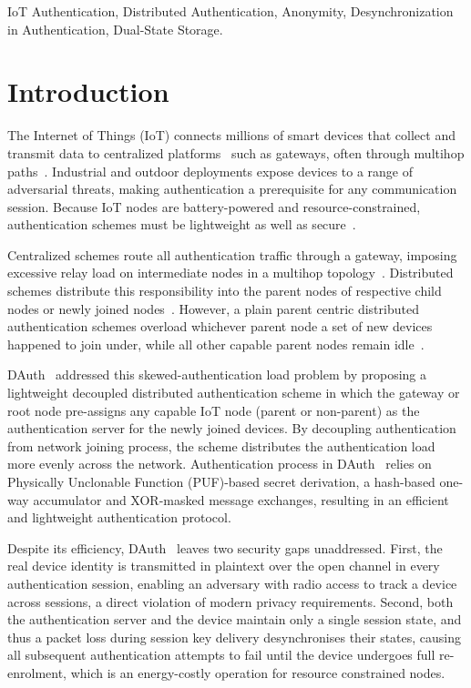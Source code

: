 \documentclass[conference]{IEEEtran}
\begin{document}
\begin{IEEEkeywords}
IoT Authentication, Distributed Authentication, Anonymity, Desynchronization in Authentication, Dual-State Storage.
\end{IEEEkeywords}

\section{Introduction}

The Internet of Things (IoT) connects millions of smart devices that collect
and transmit data to centralized platforms~\cite{zhou2021iot}
such as gateways, often through multihop paths~\cite{lajnef2022wsn}.
Industrial and outdoor deployments expose devices to a range of adversarial
threats, making authentication a prerequisite for any communication session.
Because IoT nodes are battery-powered and resource-constrained,
authentication schemes must be lightweight as well as
secure~\cite{khatua2024puf}.

Centralized schemes route all authentication traffic through a gateway,
imposing excessive relay load on intermediate nodes in a multihop
topology~\cite{sheik2023auth}\cite{he2023lightweight}\cite{roy2025design}.  Distributed
schemes distribute this responsibility into the parent nodes of respective child nodes or newly joined nodes~\cite{rosa2023lightsae}. However, a plain parent centric distributed authentication schemes
overload whichever parent node a set of new devices happened to join under, while
all other capable parent nodes remain idle~\cite{rosa2023lightsae}.

DAuth~\cite{das2026comsnets} addressed this skewed-authentication load problem by proposing a
lightweight decoupled distributed authentication scheme in which the gateway or root node
pre-assigns any capable IoT node (parent or non-parent) as the
authentication server for the newly joined devices.  By decoupling authentication
from network joining process, the scheme distributes the authentication load more evenly
across the network.  Authentication process in DAuth~\cite{das2026comsnets} relies on Physically Unclonable Function (PUF)-based secret derivation, a
hash-based one-way accumulator and
XOR-masked message exchanges, resulting in an efficient and lightweight authentication
protocol.

Despite its efficiency, DAuth~\cite{das2026comsnets} leaves two security gaps
unaddressed.  First, the real device identity is transmitted in
plaintext over the open channel in every authentication session, enabling an
adversary with radio access to track a device across sessions, a direct
violation of modern privacy requirements.  Second, both the authentication
server and the device maintain only a single session state, and thus a packet loss
during session key delivery desynchronises their states, causing all
subsequent authentication attempts to fail until the device undergoes full
re-enrolment, which is an energy-costly operation for resource
constrained nodes.
\end{document}
